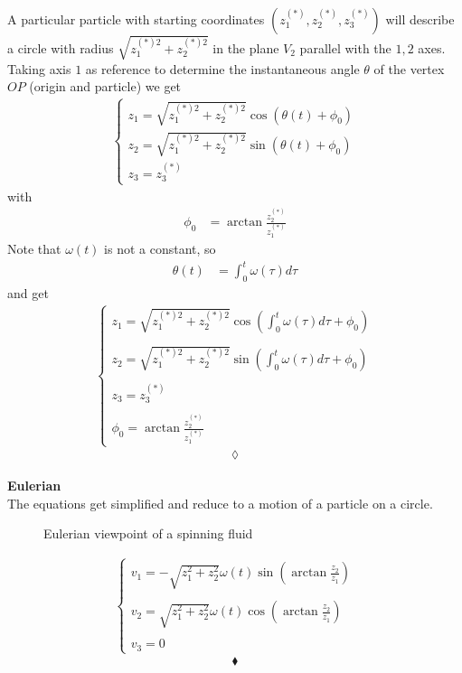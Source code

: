 A particular particle with starting coordinates $\left(z^{(*)}_1,z^{(*)}_2, z^{(*)}_3\right)$ will describe a  circle with radius $\sqrt{z^{(*)2}_1+z^{(*)2}_2}$ in the  plane $V_2$ parallel with the $1,2$ axes.
Taking axis $1$ as reference to determine the instantaneous angle $\theta$ of the vertex $OP$ (origin and particle) we get
\begin{align}
\left\{\begin{array}{l}
z_1 = \sqrt{z^{(*)2}_1+z^{(*)2}_2}\cos\left(\theta(t) + \phi_0\right)\\
z_2 = \sqrt{z^{(*)2}_1+z^{(*)2}_2}\sin\left(\theta(t) + \phi_0\right)\\
z_3 = z^{(*)}_3
\end{array}\right.
\end{align}
with 
\begin{align}
\phi_0 & = \arctan\frac{z^{(*)}_2}{z^{(*)}_1}
\end{align}
Note that $\omega(t)$ is not a constant, so
\begin{align}
\theta(t)&= \int_{0}^{t}\omega(\tau)d\tau
\end{align}
and get 
\begin{align}
\left\{\begin{array}{l}
z_1 = \sqrt{z^{(*)2}_1+z^{(*)2}_2}\cos\left(\int_{0}^{t}\omega(\tau)d\tau + \phi_0\right)\\\\
z_2 = \sqrt{z^{(*)2}_1+z^{(*)2}_2}\sin\left(\int_{0}^{t}\omega(\tau)d\tau + \phi_0\right)\\\\
z_3 = z^{(*)}_3\\\\
\phi_0 = \arctan\frac{z^{(*)}_2}{z^{(*)}_1}
\end{array}\right.
\end{align}
$$\lozenge$$\\
\newpage
\textbf{Eulerian}\\
The equations get simplified and reduce to a motion of a particle on a circle.
\begin{figure}[H]
\centering

\caption{Eulerian viewpoint of a spinning fluid}
\label{fig:fig_p191_Exa}
\end{figure}

\begin{align}
\left\{\begin{array}{l}
v_1 = -\sqrt{z^{2}_1+z^{2}_2}\omega(t)\sin\left(\arctan\frac{z^{}_2}{z^{}_1}\right)\\\\
v_2 = \sqrt{z^{2}_1+z^{2}_2}\omega(t)\cos\left(\arctan\frac{z^{}_2}{z^{}_1}\right)\\\\
v_3 = 0
\end{array}\right.
\end{align}
$$\blacklozenge$$
\newpage

